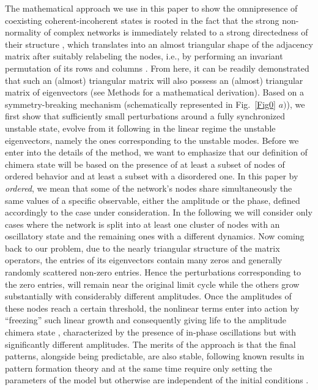 \documentclass[prx,twocolumn,amsmath,noshowkeys,noshowpacs,amssymb]{revtex4-2}
\begin{document}
The mathematical approach we use in this paper to show the omnipresence of coexisting coherent-incoherent states is rooted in the fact that the strong non-normality of complex networks is immediately related to a strong directedness of their structure \cite{asllani2018structure}, which translates into an almost triangular shape of the adjacency matrix after suitably relabeling the nodes, i.e., by performing an invariant permutation of its rows and columns \cite{asllani2018structure, OBrien_NN}. From here, it can be readily demonstrated that such an (almost) triangular matrix will also possess an (almost) triangular matrix of eigenvectors (see Methods for a mathematical derivation). Based on a symmetry-breaking mechanism (schematically represented in Fig.~\ref{Fig0} $a)$), we first show that sufficiently small perturbations around a fully synchronized unstable state, evolve from it following in the linear regime the unstable eigenvectors, namely the ones corresponding to the unstable modes. Before we enter into the details of the method, we want to emphasize that our definition of chimera state will be based on the presence of at least a subset of nodes of ordered behavior and at least a subset with a disordered one. In this paper by \emph{ordered}, we mean that some of the network's nodes share simultaneously the same values of a specific observable, either the amplitude or the phase, defined accordingly to the case under consideration. %
In the following we will consider only cases where the network is split into at least one cluster of nodes with an oscillatory state and the remaining ones with a different dynamics. Now coming back to our problem, due to the nearly triangular structure of the matrix operators, the entries of its eigenvectors contain many zeros and generally randomly scattered non-zero entries. Hence the perturbations corresponding to the zero entries, will remain near the original limit cycle while the others grow substantially with considerably different amplitudes. Once the amplitudes of these nodes reach a certain threshold, the nonlinear terms enter into action by ``freezing'' such linear growth and consequently giving life to the amplitude chimera state \cite{amp_chimera}, characterized by the presence of in-phase oscillations but with significantly different amplitudes. The merits of the approach is that the final patterns, {alongside being predictable,} are also stable, following known results in pattern formation theory and at the same time require only setting the parameters of the model but otherwise are independent of the initial conditions \cite{symm_break}.  
\end{document}
